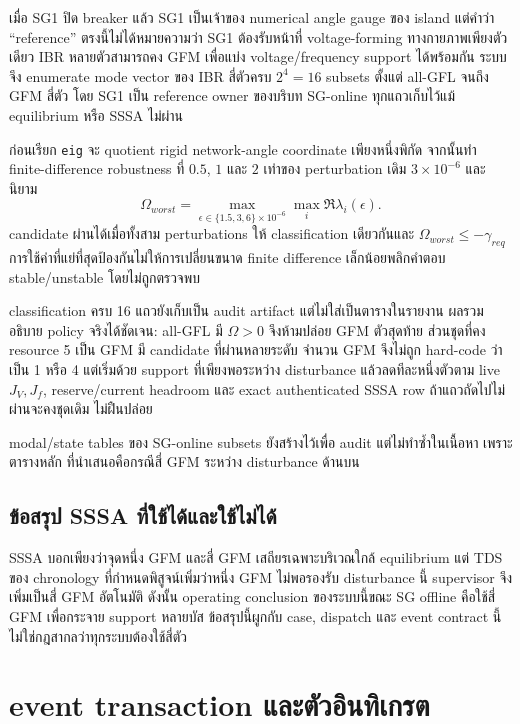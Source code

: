 \documentclass[12pt,a4paper]{article}
\begin{document}
เมื่อ SG1 ปิด breaker แล้ว SG1 เป็นเจ้าของ numerical angle gauge ของ island แต่คำว่า ``reference''
ตรงนี้ไม่ได้หมายความว่า SG1 ต้องรับหน้าที่ voltage-forming ทางกายภาพเพียงตัวเดียว IBR หลายตัวสามารถคง
GFM เพื่อแบ่ง voltage/frequency support ได้พร้อมกัน ระบบจึง enumerate mode vector ของ IBR สี่ตัวครบ
$2^4=16$ subsets ตั้งแต่ all-GFL จนถึง GFM สี่ตัว โดย SG1 เป็น reference owner ของบริบท SG-online
ทุกแถวเก็บไว้แม้ equilibrium หรือ SSSA ไม่ผ่าน

ก่อนเรียก \texttt{eig} จะ quotient rigid network-angle coordinate เพียงหนึ่งพิกัด จากนั้นทำ
finite-difference robustness ที่ $0.5$, $1$ และ $2$ เท่าของ perturbation เดิม
$3\times10^{-6}$ และนิยาม
\begin{equation}
\Omega_{worst}=\max_{\epsilon\in\{1.5,3,6\}\times10^{-6}}
\max_i\Re\lambda_i(\epsilon).
\end{equation}
candidate ผ่านได้เมื่อทั้งสาม perturbations ให้ classification เดียวกันและ
$\Omega_{worst}\le-\gamma_{req}$ การใช้ค่าที่แย่ที่สุดป้องกันไม่ให้การเปลี่ยนขนาด finite difference
เล็กน้อยพลิกคำตอบ stable/unstable โดยไม่ถูกตรวจพบ

classification ครบ 16 แถวยังเก็บเป็น audit artifact แต่ไม่ใส่เป็นตารางในรายงาน ผลรวมอธิบาย policy
จริงได้ชัดเจน: all-GFL มี $\Omega>0$ จึงห้ามปล่อย GFM ตัวสุดท้าย
ส่วนชุดที่คง resource 5 เป็น GFM มี candidate ที่ผ่านหลายระดับ จำนวน GFM จึงไม่ถูก hard-code ว่าเป็น 1
หรือ 4 แต่เริ่มด้วย support ที่เพียงพอระหว่าง disturbance แล้วลดทีละหนึ่งตัวตาม live $J_V,J_f$,
reserve/current headroom และ exact authenticated SSSA row ถ้าแถวถัดไปไม่ผ่านจะคงชุดเดิม ไม่ฝืนปล่อย

modal/state tables ของ SG-online subsets ยังสร้างไว้เพื่อ audit แต่ไม่ทำซ้ำในเนื้อหา เพราะตารางหลัก
ที่นำเสนอคือกรณีสี่ GFM ระหว่าง disturbance ด้านบน

\subsection{ข้อสรุป SSSA ที่ใช้ได้และใช้ไม่ได้}

SSSA บอกเพียงว่าจุดหนึ่ง GFM และสี่ GFM เสถียรเฉพาะบริเวณใกล้ equilibrium แต่ TDS ของ chronology
ที่กำหนดพิสูจน์เพิ่มว่าหนึ่ง GFM ไม่พอรองรับ disturbance นี้ supervisor จึงเพิ่มเป็นสี่ GFM อัตโนมัติ
ดังนั้น operating conclusion ของระบบนี้ขณะ SG offline คือใช้สี่ GFM เพื่อกระจาย support หลายบัส
ข้อสรุปนี้ผูกกับ case, dispatch และ event contract นี้ ไม่ใช่กฎสากลว่าทุกระบบต้องใช้สี่ตัว

\section{event transaction และตัวอินทิเกรต}
\end{document}
